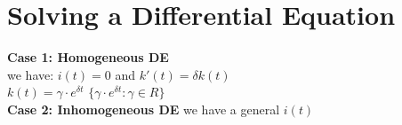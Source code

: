 \documentclass{article}
\begin{document}
\section*{Solving a Differential Equation}
\textbf{Case 1: Homogeneous DE}\\[2mm]
we have: 
\hspace{10mm}$i(t) = 0$ \hspace{5mm}and
\hspace{5mm}$k'(t) = \delta k(t)$ \\[2mm]
 $k(t)=\gamma\cdot e^{\delta t}$ \newline
{} $\{\gamma\cdot e^{\delta t} : \gamma \in R\}$ \\[3mm]
\textbf{Case 2: Inhomogeneous DE} \hspace{5mm} we have a general $i(t)$ 
\end{document}
